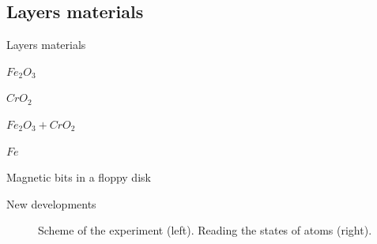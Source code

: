 \documentclass{beamer}
\begin{document}
    \subsection{Layers materials}
    \begin{frame}[label=simmonshall]{Layers materials}
    
      \begin{block}{$Fe_2O_3$}
      \end{block}

      \begin{block}{$CrO_2$}
      \end{block}

      \begin{block}{$Fe_2O_3 + CrO_2$}
      \end{block}

      \begin{block}{$Fe$}  
      \end{block}

    \end{frame}
    \begin{frame}[label=proof]{Magnetic bits in a floppy disk}
    
    \begin{figure}[h]
    \end{figure}

    \end{frame}

  \begin{frame}[label=proof]{New developments}
  \begin{figure}[h]
  \caption{Scheme of the experiment (left). Reading the states of atoms (right).}
  \end{figure}
  \end{frame}
\end{document}
